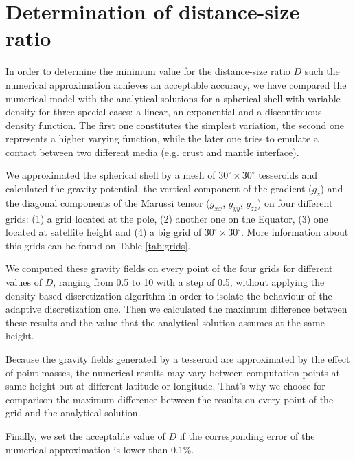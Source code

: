 \documentclass[extra]{gji}
\begin{document}

\section{Determination of distance-size ratio}

In order to determine the minimum value for the distance-size ratio $D$ such the numerical approximation achieves an acceptable accuracy, we have compared the numerical model with the analytical solutions for a spherical shell with variable density for three special cases: a linear, an exponential and a discontinuous density function.
The first one constitutes the simplest variation, the second one represents a higher varying function, while the later one tries to emulate a contact between two different media (e.g. crust and mantle interface).

We approximated the spherical shell by a mesh of $30^\circ \times 30^\circ$ tesseroids and calculated the gravity potential, the vertical component of the gradient ($g_z$) and the diagonal components of the Marussi tensor ($g_{xx}$, $g_{yy}$, $g_{zz}$) on four different grids: (1) a grid located at the pole, (2) another one on the Equator, (3) one located at satellite height and (4) a big grid of $30^\circ \times 30^\circ$.
More information about this grids can be found on Table \ref{tab:grids}.

We computed these gravity fields on every point of the four grids for different values of $D$, ranging from 0.5 to 10 with a step of 0.5, without applying the density-based discretization algorithm in order to isolate the behaviour of the adaptive discretization one.
Then we calculated the maximum difference between these results and the value that the analytical solution assumes at the same height.

Because the gravity fields generated by a tesseroid are approximated by the effect of point masses, the numerical results may vary between computation points at same height but at different latitude or longitude.
That's why we choose for comparison the maximum difference between the results on every point of the grid and the analytical solution.

Finally, we set the acceptable value of $D$ if the corresponding error of the numerical approximation is lower than 0.1\%.
\end{document}
